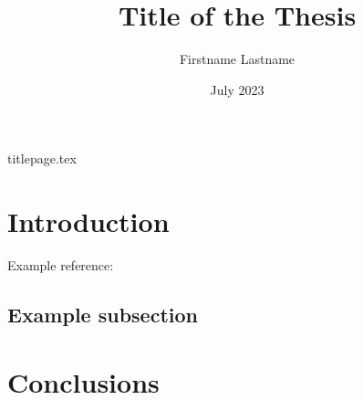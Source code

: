 \documentclass[a4paper,12pt]{article} %
\author{Firstname Lastname}
\title{Title of the Thesis}
\date{July 2023}
\begin{document}
\begin{titlepage}
{titlepage.tex}
\end{titlepage}

\thispagestyle{empty}
\tableofcontents

\section{Introduction}
\setcounter{page}{3}

Example reference: \autocite{sigfridsson}
\lipsum[22-24]

\subsection{Example subsection}

\lipsum[2-12]

\section{Conclusions}

\lipsum[15-20]



\nocite{*}
\printbibliography
\end{document}
